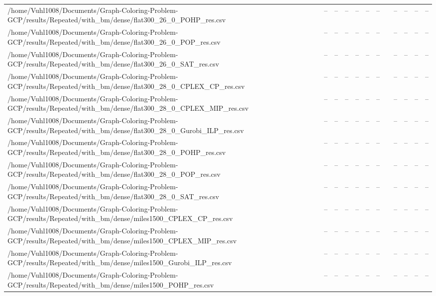 \begin{table}[htbp]
\begin{tabular}{llllllllllll}
/home/Vuhl1008/Documents/Graph-Coloring-Problem-GCP/results/Repeated/with\_bm/dense/flat300\_26\_0\_POHP\_res.csv & -- & -- & -- & -- & -- & -- & {} & -- & -- & -- & -- \\
/home/Vuhl1008/Documents/Graph-Coloring-Problem-GCP/results/Repeated/with\_bm/dense/flat300\_26\_0\_POP\_res.csv & -- & -- & -- & -- & -- & -- & {} & -- & -- & -- & -- \\
/home/Vuhl1008/Documents/Graph-Coloring-Problem-GCP/results/Repeated/with\_bm/dense/flat300\_26\_0\_SAT\_res.csv & -- & -- & -- & -- & -- & -- & {} & -- & -- & -- & -- \\
/home/Vuhl1008/Documents/Graph-Coloring-Problem-GCP/results/Repeated/with\_bm/dense/flat300\_28\_0\_CPLEX\_CP\_res.csv & -- & -- & -- & -- & -- & -- & {} & -- & -- & -- & -- \\
/home/Vuhl1008/Documents/Graph-Coloring-Problem-GCP/results/Repeated/with\_bm/dense/flat300\_28\_0\_CPLEX\_MIP\_res.csv & -- & -- & -- & -- & -- & -- & {} & -- & -- & -- & -- \\
/home/Vuhl1008/Documents/Graph-Coloring-Problem-GCP/results/Repeated/with\_bm/dense/flat300\_28\_0\_Gurobi\_ILP\_res.csv & -- & -- & -- & -- & -- & -- & {} & -- & -- & -- & -- \\
/home/Vuhl1008/Documents/Graph-Coloring-Problem-GCP/results/Repeated/with\_bm/dense/flat300\_28\_0\_POHP\_res.csv & -- & -- & -- & -- & -- & -- & {} & -- & -- & -- & -- \\
/home/Vuhl1008/Documents/Graph-Coloring-Problem-GCP/results/Repeated/with\_bm/dense/flat300\_28\_0\_POP\_res.csv & -- & -- & -- & -- & -- & -- & {} & -- & -- & -- & -- \\
/home/Vuhl1008/Documents/Graph-Coloring-Problem-GCP/results/Repeated/with\_bm/dense/flat300\_28\_0\_SAT\_res.csv & -- & -- & -- & -- & -- & -- & {} & -- & -- & -- & -- \\
/home/Vuhl1008/Documents/Graph-Coloring-Problem-GCP/results/Repeated/with\_bm/dense/miles1500\_CPLEX\_CP\_res.csv & -- & -- & -- & -- & -- & -- & {} & -- & -- & -- & -- \\
/home/Vuhl1008/Documents/Graph-Coloring-Problem-GCP/results/Repeated/with\_bm/dense/miles1500\_CPLEX\_MIP\_res.csv & -- & -- & -- & -- & -- & -- & {} & -- & -- & -- & -- \\
/home/Vuhl1008/Documents/Graph-Coloring-Problem-GCP/results/Repeated/with\_bm/dense/miles1500\_Gurobi\_ILP\_res.csv & -- & -- & -- & -- & -- & -- & {} & -- & -- & -- & -- \\
/home/Vuhl1008/Documents/Graph-Coloring-Problem-GCP/results/Repeated/with\_bm/dense/miles1500\_POHP\_res.csv & -- & -- & -- & -- & -- & -- & {} & -- & -- & -- & -- \\

\end{tabular}
\end{table}
